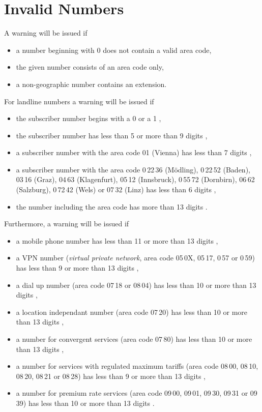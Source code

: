 \documentclass[numbers=noenddot]{scrreprt}
\newcommand\UeberschriftUngueltig{\section{Invalid Numbers}}
\newcommand\WarnungWenn{A warning will be issued if}
\begin{document}
\UeberschriftUngueltig
\WarnungWenn
\begin{itemize}
\item a number beginning with 0 does not contain a valid area code,
\item the given number consists of an area code only,
\item a non-geographic number contains an extension.
\end{itemize}
For landline numbers a warning will be issued if
\begin{itemize}
\item the subscriber number begins with a 0 or a 1 \cite[§\,50 (9)]{RTR-Verordnung},
\item the subscriber number has less than 5 or more than 9 digits \cite[§\,50 (3) and (5)]{RTR-Verordnung},
\item a subscriber number with the area code 01 (Vienna) has less than 7 digits \cite[§\,50 (4)]{RTR-Verordnung},
\item a subscriber number with the area code
0\,22\,36 (Mödling), 0\,22\,52 (Baden), 03\,16 (Graz), 04\,63 (Klagenfurt), 05\,12 (Innsbruck), 0\,55\,72 (Dornbirn), 06\,62 (Salzburg), 0\,72\,42 (Wels) or 07\,32 (Linz)
has less than 6 digits \cite[§\,50 (4)]{RTR-Verordnung},
\item the number including the area code has more than 13 digits \cite[§\,50 (5)]{RTR-Verordnung}.
\end{itemize}
Furthermore, a warning will be issued if
\begin{itemize}
\item a mobile phone number has less than 11 or more than 13 digits \cite[§\,61 (1)]{RTR-Verordnung},
\item a VPN number (\emph{virtual private network}, area code
05\,0X, 05\,17, 0\,57 or 0\,59)
has less than 9 or more than 13 digits \cite[§\,56 (1) and §\,4 (4)]{RTR-Verordnung},
\item a dial up number (area code
07\,18 or 08\,04)
has less than 10 or more than 13 digits \cite[§\,66]{RTR-Verordnung},
\item a location independant number (area code
07\,20)
has less than 10 or more than 13 digits \cite[§\,71]{RTR-Verordnung},
\item a number for convergent services (area code
07\,80)
has less than 10 or more than 13 digits \cite[§\,76]{RTR-Verordnung},
\item a number for services with regulated maximum tariffs (area code
08\,00, 08\,10, 08\,20, 08\,21 or 08\,28)
has less than 9 or more than 13 digits \cite[§\,81]{RTR-Verordnung},
\item a number for premium rate services (area code
09\,00, 09\,01, 09\,30, 09\,31 or 09\,39)
has less than 10 or more than 13 digits \cite[§\,87]{RTR-Verordnung}.
\end{itemize}
\end{document}
